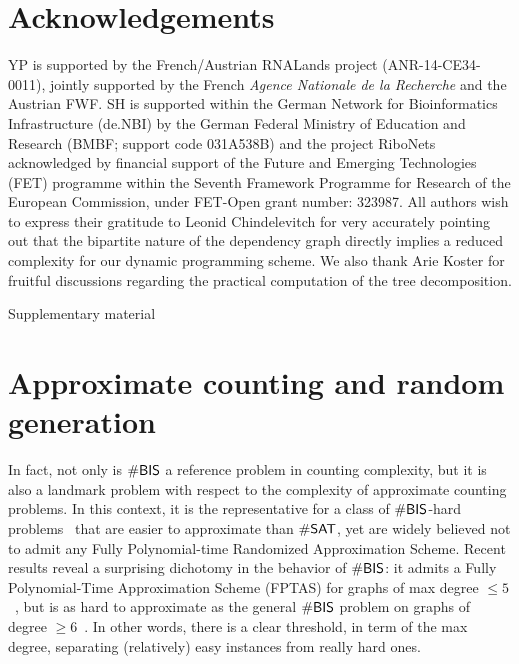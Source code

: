 \documentclass{bioinfo}
\begin{document}
\newpage 
\section*{Acknowledgements}
YP is supported by the French/Austrian RNALands project (ANR-14-CE34-0011), jointly supported by the French {\em Agence Nationale de la Recherche} and the Austrian FWF.
SH is supported within the
German Network for Bioinformatics Infrastructure (de.NBI) by the
German Federal Ministry of Education and Research (BMBF; support code
031A538B) and the project RiboNets acknowledged by financial support of the Future and Emerging Technologies (FET) programme within the Seventh Framework Programme for Research of the European Commission, under FET-Open grant number: 323987. 
All authors wish to express their gratitude to Leonid Chindelevitch for very accurately pointing out that the bipartite nature of the dependency graph directly implies a reduced complexity for our dynamic programming scheme. We also thank Arie Koster for fruitful discussions regarding the practical computation of the tree decomposition.



%
%
%
%
%
%
%



\newpage 

\appendix
{\centering {}Supplementary material\\%
}

\section{Approximate counting and random generation}
In fact, not only is $\#{\sf BIS}$ a reference problem in counting complexity, but it is also a landmark problem with respect to the complexity of approximate counting problems. In this context, it is the representative for a class of $\#{\sf BIS}$-hard problems~\cite{Bulatov2013} that are easier to approximate than $\# {\sf SAT}$, yet are widely believed not to admit any Fully Polynomial-time Randomized Approximation Scheme. Recent results reveal a surprising dichotomy in the behavior of $\#{\sf BIS}$: it admits a Fully Polynomial-Time Approximation Scheme (FPTAS) for graphs of max degree $\le 5$~\cite{Weitz2006}, but is as hard to approximate as the general $\#{\sf BIS}$ problem on graphs of degree $\ge 6$~\cite{Cai2016}. In other words, there is a clear threshold, in term of the max degree, separating (relatively) easy instances from really hard ones.
\end{document}
